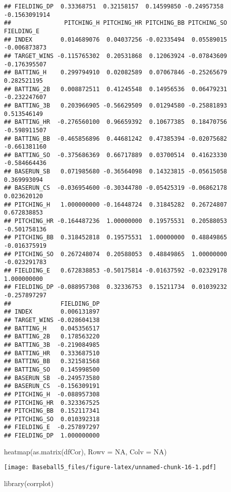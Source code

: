 \documentclass[
]{article}
\newenvironment{Shaded}{\begin{snugshade}}{\end{snugshade}}
\newcommand{\AttributeTok}[1]{\textcolor[rgb]{0.77,0.63,0.00}{#1}}
\newcommand{\ConstantTok}[1]{\textcolor[rgb]{0.00,0.00,0.00}{#1}}
\newcommand{\FunctionTok}[1]{\textcolor[rgb]{0.00,0.00,0.00}{#1}}
\newcommand{\NormalTok}[1]{#1}
\begin{document}
\begin{verbatim}
## FIELDING_DP  0.33368751  0.32158157  0.14599850 -0.24957358 -0.1563091914
##               PITCHING_H PITCHING_HR PITCHING_BB PITCHING_SO   FIELDING_E
## INDEX        0.014689076  0.04037256 -0.02335494  0.05589015 -0.006873873
## TARGET_WINS -0.115765302  0.20531868  0.12063924 -0.07843609 -0.176395507
## BATTING_H    0.299794910  0.02082589  0.07067846 -0.25265679  0.282521195
## BATTING_2B   0.008872511  0.41245548  0.14956536  0.06479231 -0.232247607
## BATTING_3B   0.203966905 -0.56629509  0.01294580 -0.25881893  0.513546149
## BATTING_HR  -0.276560100  0.96659392  0.10677385  0.18470756 -0.598911507
## BATTING_BB  -0.465856896  0.44681242  0.47385394 -0.02075682 -0.661381160
## BATTING_SO  -0.375686369  0.66717889  0.03700514  0.41623330 -0.584664436
## BASERUN_SB   0.071985680 -0.36564098  0.14323815 -0.05615058  0.369993094
## BASERUN_CS  -0.036954600 -0.30344780 -0.05425319 -0.06862178  0.023620120
## PITCHING_H   1.000000000 -0.16448724  0.31845282  0.26724807  0.672838853
## PITCHING_HR -0.164487236  1.00000000  0.19575531  0.20588053 -0.501758136
## PITCHING_BB  0.318452818  0.19575531  1.00000000  0.48849865 -0.016375919
## PITCHING_SO  0.267248074  0.20588053  0.48849865  1.00000000 -0.023291783
## FIELDING_E   0.672838853 -0.50175814 -0.01637592 -0.02329178  1.000000000
## FIELDING_DP -0.088957308  0.32336753  0.15211734  0.01039232 -0.257897297
##              FIELDING_DP
## INDEX        0.006131897
## TARGET_WINS -0.028604138
## BATTING_H    0.045356517
## BATTING_2B   0.178563220
## BATTING_3B  -0.219084985
## BATTING_HR   0.333687510
## BATTING_BB   0.321581568
## BATTING_SO   0.145998500
## BASERUN_SB  -0.249573580
## BASERUN_CS  -0.156309191
## PITCHING_H  -0.088957308
## PITCHING_HR  0.323367525
## PITCHING_BB  0.152117341
## PITCHING_SO  0.010392318
## FIELDING_E  -0.257897297
## FIELDING_DP  1.000000000
\end{verbatim}

\begin{Shaded}
\begin{Highlighting}[]
\FunctionTok{heatmap}\NormalTok{(}\FunctionTok{as.matrix}\NormalTok{(dfCor), }\AttributeTok{Rowv =} \ConstantTok{NA}\NormalTok{, }\AttributeTok{Colv =} \ConstantTok{NA}\NormalTok{) }
\end{Highlighting}
\end{Shaded}

\texttt{[image: Baseball5\_files/figure-latex/unnamed-chunk-16-1.pdf]}

\begin{Shaded}
\begin{Highlighting}[]
\FunctionTok{library}\NormalTok{(corrplot)}
\end{Highlighting}
\end{Shaded}
\end{document}
